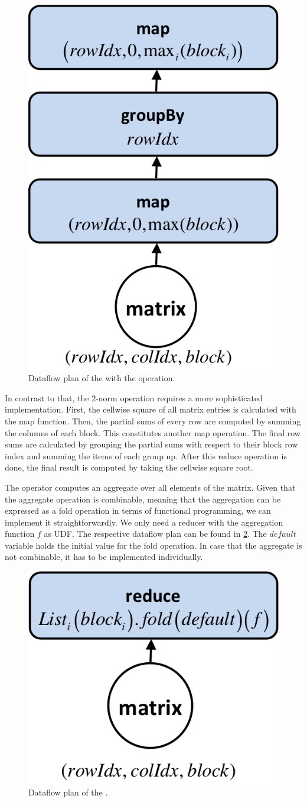 \begin{figure}[!h]
	\centering
	\includegraphics[width=0.25\linewidth]{images/planMaximumVectorwiseTransformation.png}
	\caption{Dataflow plan of the  with the  operation.}
	\label{fig:planMaximumVectorwiseTransformation}
\end{figure}

In contrast to that, the $2$-norm operation requires a more sophisticated implementation.
First, the cellwise square of all matrix entries is calculated with the map function.
Then, the partial sums of every row are computed by summing the columns of each block.
This constitutes another map operation.
The final row sums are calculated by grouping the partial sums with respect to their block row index and summing the items of each group up.
After this reduce operation is done, the final result is computed by taking the cellwise square root.

The  operator computes an aggregate over all elements of the matrix.
Given that the aggregate operation is combinable, meaning that the aggregation can be expressed as a fold operation in terms of functional programming, we can implement it straightforwardly.
We only need a reducer with the aggregation function $f$ as UDF.
The respective dataflow plan can be found in \cref{fig:planAggregateMatrixTransformation}.
The $default$ variable holds the initial value for the fold operation.
In case that the aggregate is not combinable, it has to be implemented individually.

\begin{figure}[!h]
	\centering
	\includegraphics[width=0.25\linewidth]{images/planAggregateMatrixTransformation.png}
	\caption{Dataflow plan of the .}
	\label{fig:planAggregateMatrixTransformation}
\end{figure}